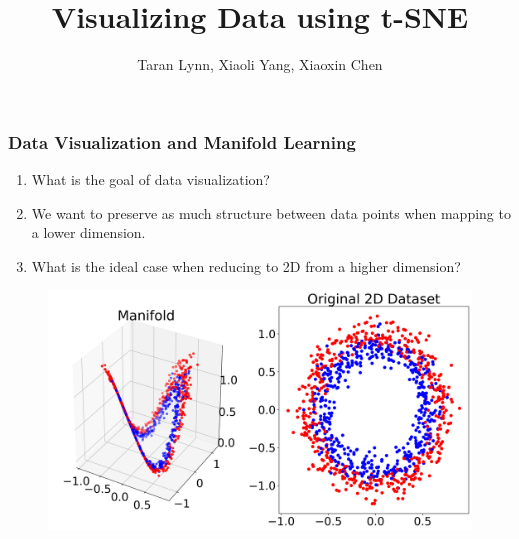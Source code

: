 \documentclass{beamer}
\title{Visualizing Data using t-SNE}
\author{Taran Lynn, Xiaoli Yang, Xiaoxin Chen}
\begin{document}
\maketitle

\begin{frame}
  \frametitle{Data Visualization and Manifold Learning}

  \begin{enumerate}
  \item What is the goal of data visualization?

    \pause

  \item We want to preserve as much structure between data points when
    mapping to a lower dimension.

  \item What is the ideal case when reducing to 2D from a higher dimension?
  \end{enumerate}

  \pause

  \begin{figure}
    \centering
    \includegraphics[height=0.5\textheight]{images/manifold/manifold.png}
  \end{figure}
\end{frame}
\end{document}
